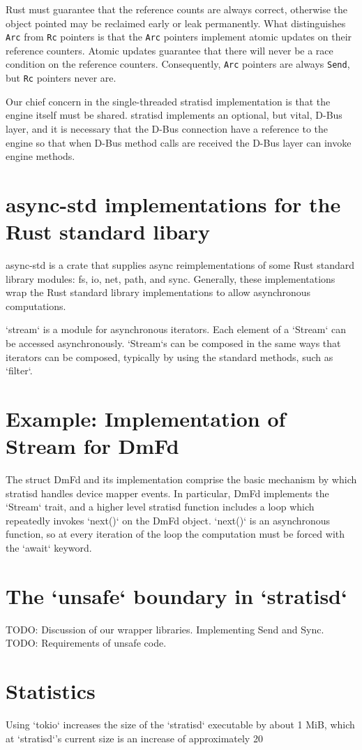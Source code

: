 \documentclass[]{article}
\begin{document}
Rust must guarantee that the reference counts are always correct, otherwise the object pointed may be reclaimed early or leak permanently. What distinguishes \texttt{Arc} from \texttt{Rc} pointers is that the \texttt{Arc} pointers implement atomic updates on their reference counters. Atomic updates
guarantee that there will never be a race condition on the reference counters. Consequently, \texttt{Arc} pointers are always \texttt{Send}, but \texttt{Rc} pointers never are.

Our chief concern in the single-threaded stratisd implementation is that the engine itself must be shared. stratisd implements an optional, but vital, D-Bus layer, and it is necessary that the D-Bus connection have a reference to the engine so that when D-Bus method calls are received the D-Bus layer can invoke engine methods.

\section{async-std implementations for the Rust standard libary}
async-std is a crate that supplies async reimplementations of some Rust standard library modules: fs, io, net, path, and
sync. Generally, these implementations wrap the Rust standard library implementations to allow asynchronous computations.

`stream` is a module for asynchronous iterators. Each element of a `Stream` can be accessed asynchronously. `Stream`s can be composed in the same ways that iterators can be composed, typically by using the standard methods, such as `filter`.

\section{Example: Implementation of Stream for DmFd}
The struct DmFd and its implementation comprise the basic mechanism by which stratisd handles device mapper events. In particular, DmFd implements the `Stream` trait, and a higher level stratisd function includes a loop which repeatedly invokes `next()` on the DmFd object. `next()` is an asynchronous function, so at every iteration of the loop the computation must be forced with the `await` keyword.

\section{The `unsafe` boundary in `stratisd`}
TODO: Discussion of our wrapper libraries. Implementing Send and Sync.
TODO: Requirements of unsafe code.

\section{Statistics}
Using `tokio` increases the size of the `stratisd` executable by about 1 MiB, which at `stratisd`'s current size is an increase of approximately 20%
\end{document}
